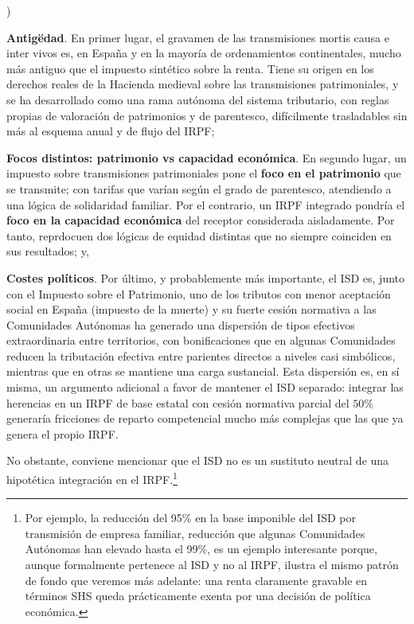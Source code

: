 \documentclass[10pt,a4paper]{article}
\newcounter{alphaitem}
\newenvironment{la}
      {\begin{list}{\alph{alphaitem})}{%
          \usecounter{alphaitem}%
          \setlength{\leftmargin}{1cm}%
          \setlength{\parskip}{3pt}%
          \setlength{\itemsep}{0pt}%
          \setlength{\parsep}{0pt}%
      }}
      {\end{list}}
\begin{document}
\begin{la}
    \item \textbf{Antigëdad}. En primer lugar, el gravamen de las transmisiones mortis causa e inter vivos es, en España y en la mayoría de ordenamientos continentales, mucho más antiguo que el impuesto sintético sobre la renta. Tiene su origen en los derechos reales de la Hacienda medieval sobre las transmisiones patrimoniales, y se ha desarrollado como una rama autónoma del sistema tributario, con reglas propias de valoración de patrimonios y de parentesco, difícilmente trasladables sin más al esquema anual y de flujo del IRPF;
    \item \textbf{Focos distintos: patrimonio vs capacidad económica}. En segundo lugar, un impuesto sobre transmisiones patrimoniales pone el \textbf{foco en el patrimonio} que se transmite; con tarifas que varían según el grado de parentesco, atendiendo a una lógica de solidaridad familiar. Por el contrario, un IRPF integrado pondría el \textbf{foco en la capacidad económica} del receptor considerada aisladamente. Por tanto, reprdocuen dos lógicas de equidad distintas que no siempre coinciden en sus resultados; y,
    \item \textbf{Costes políticos}. Por último, y probablemente más importante, el ISD es, junto con el Impuesto sobre el Patrimonio, uno de los tributos con menor aceptación social en España (impuesto de la muerte) y su fuerte cesión normativa a las Comunidades Autónomas ha generado una dispersión de tipos efectivos extraordinaria entre territorios, con bonificaciones que en algunas Comunidades reducen la tributación efectiva entre parientes directos a niveles casi simbólicos, mientras que en otras se mantiene una carga sustancial. Esta dispersión es, en sí misma, un argumento adicional a favor de mantener el ISD separado: integrar las herencias en un IRPF de base estatal con cesión normativa parcial del $50\%$ generaría fricciones de reparto competencial mucho más complejas que las que ya genera el propio IRPF.
\end{la}

No obstante, conviene mencionar que el ISD no es un sustituto neutral de una hipotética integración en el IRPF.\footnote{%
    Por ejemplo, la reducción del 95\% en la base imponible del ISD por transmisión de empresa familiar, reducción que algunas Comunidades Autónomas han elevado hasta el 99\%, es un ejemplo interesante porque, aunque formalmente pertenece al ISD y no al IRPF, ilustra el mismo patrón de fondo que veremos más adelante: una renta claramente gravable en términos SHS queda prácticamente exenta por una decisión de política económica.
}
\end{document}
